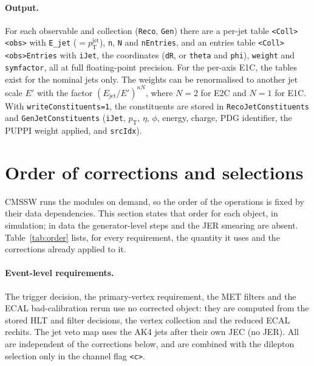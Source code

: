 \documentclass[11pt]{article}
\newcommand{\pt}{p_{\mathrm{T}}}
\newcommand{\ptj}{\pt^{\mathrm{jet}}}
\newcommand{\code}[1]{\texttt{#1}}
\begin{document}
\paragraph{Output.} For each observable and collection (\code{Reco}, \code{Gen}) there are a per-jet table
\code{<Coll><obs>} with \code{E\_jet} ($= \ptj$), \code{n}, \code{N} and \code{nEntries}, and an entries table
\code{<Coll><obs>Entries} with \code{iJet}, the coordinates (\code{dR}, or \code{theta} and \code{phi}), \code{weight}
and \code{symfactor}, all at full floating-point precision. For the per-axis E1C, the tables exist for the nominal jets
only. The weights can be renormalised to another jet scale $E'$
with the factor $(E_\mathrm{jet}/E')^{nN}$, where $N = 2$ for E2C and $N = 1$ for E1C. With \code{writeConstituents=1},
the constituents are stored in \code{RecoJetConstituents} and \code{GenJetConstituents} (\code{iJet}, $\pt$, $\eta$,
$\phi$, energy, charge, PDG identifier, the PUPPI weight applied, and \code{srcIdx}).

\section{Order of corrections and selections}
\label{sec:order}

CMSSW runs the modules on demand, so the order of the operations is fixed by their data dependencies. This section
states that order for each object, in simulation; in data the generator-level steps and the JER smearing are absent.
Table~\ref{tab:order} lists, for every requirement, the quantity it uses and the corrections already applied to it.

\paragraph{Event-level requirements.} The trigger decision, the primary-vertex requirement, the MET filters and the
ECAL bad-calibration rerun use no corrected object: they are computed from the stored HLT and filter decisions, the
vertex collection and the reduced ECAL rechits. The jet veto map uses the AK4 jets after their own JEC (no JER).
All are independent of the corrections below, and are combined with the dilepton selection only in the channel flag
\code{<c>}.
\end{document}

